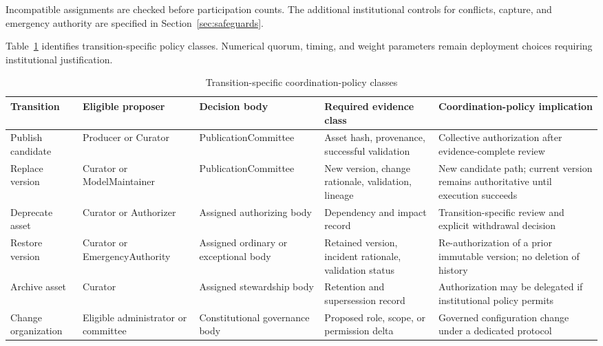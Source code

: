 \documentclass[journal]{IEEEtran}
\begin{document}
Incompatible assignments are checked before participation counts.
The additional institutional controls for conflicts, capture, and
emergency authority are specified in Section~\ref{sec:safeguards}.

Table~\ref{tab:dao_mechanisms} identifies transition-specific
policy classes. Numerical quorum, timing, and weight parameters
remain deployment choices requiring institutional justification.

\begin{table}[t]
\caption{Transition-specific coordination-policy classes}
\label{tab:dao_mechanisms}
\centering
\renewcommand{\arraystretch}{1.10}
\setlength{\tabcolsep}{4pt}
\begin{tabular}{p{2.4cm}p{2.6cm}p{3.0cm}p{3.0cm}p{5.0cm}}
\hline
\textbf{Transition} &
\textbf{Eligible proposer} &
\textbf{Decision body} &
\textbf{Required evidence class} &
\textbf{Coordination-policy implication}\\
\hline

Publish candidate &
Producer or Curator &
PublicationCommittee &
Asset hash, provenance, successful validation &
Collective authorization after evidence-complete review\\

Replace version &
Curator or Model\allowbreak Maintainer &
PublicationCommittee &
New version, change rationale, validation, lineage &
New candidate path; current version remains authoritative
until execution succeeds\\

Deprecate asset &
Curator or Authorizer &
Assigned authorizing body &
Dependency and impact record &
Transition-specific review and explicit withdrawal decision\\

Restore version &
Curator or Emergency\allowbreak Authority &
Assigned ordinary or exceptional body &
Retained version, incident rationale, validation status &
Re-authorization of a prior immutable version;
no deletion of history\\

Archive asset &
Curator &
Assigned stewardship body &
Retention and supersession record &
Authorization may be delegated if institutional policy permits\\

Change organization &
Eligible administrator or committee &
Constitutional governance body &
Proposed role, scope, or permission delta &
Governed configuration change under a dedicated protocol\\

\hline
\end{tabular}
\end{table}
\end{document}
